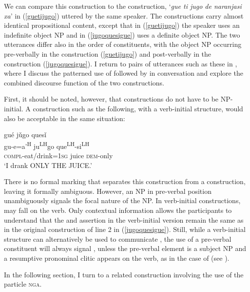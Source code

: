 We can compare this construction to the  construction, `\textit{gue ti jugo de naranjasi xa}' in (\ref{guetijugo}) uttered by the same speaker. The constructions carry almost identical propositional content, except that in (\ref{guetijugo}) the speaker uses an indefinite object NP and in (\ref{jugoquesigue}) uses a definite object NP. The two utterances differ also in the order of constituents, with the object NP occurring pre-verbally in the  construction (\ref{guetijugo}) and post-verbally in the  construction (\ref{jugoquesigue}). I return to pairs of utterances such as these in , where I discuss the patterned use of  followed by  in conversation and explore the combined discourse function of the two constructions. 

First, it should be noted, however, that  constructions do not have to be NP-initial. A construction such as the following, with a verb-initial structure, would also be acceptable in the same situation:

\ea
\glll gu\'{e} j\v{u}go ques\v{i}  \\
gu-e=a'\textsuperscript{H} ju\textsuperscript{LH}go que\textsuperscript{LH}-si\textsuperscript{LH}  \\
\textsc{compl}-eat/drink=\textsc{1sg} juice \textsc{dem}-only  \\
\glt `I drank ONLY THE JUICE.'  

\z
There is no formal marking that separates this construction from a  construction, leaving it formally ambiguous. However, an NP in pre-verbal position unambiguously signals the focal nature of the NP. In verb-initial constructions,  may fall on the verb. Only contextual information allows the participants to understand that the  and assertion in the verb-initial version remain the same as in the original construction of line 2 in (\ref{jugoquesigue}). Still, while a verb-initial structure can alternatively be used to communicate , the use of a pre-verbal constituent will always signal , unless the pre-verbal element is a subject NP and a resumptive pronominal clitic appears on the verb, as in the case of  (see ). 

In the following section, I turn to a related  construction involving the use of the particle \textsc{nga}.

